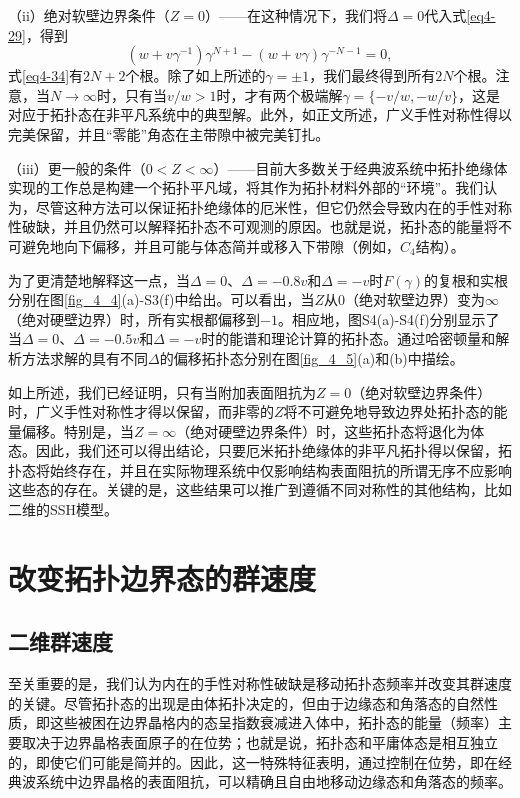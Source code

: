 （ii）绝对软壁边界条件（\(Z = 0\)）——在这种情况下，我们将\(\Delta = 0\)代入式\ref{eq4-29}，得到
\begin{equation}\label{eq4-34}
(w + v\gamma^{-1})\gamma^{N + 1}-(w + v\gamma)\gamma^{-N - 1}=0,
\end{equation}
式\ref{eq4-34}有\(2N + 2\)个根。除了如上所述的\(\gamma=\pm1\)，我们最终得到所有\(2N\)个根。注意，当\(N\rightarrow\infty\)时，只有当\(v/w > 1\)时，才有两个极端解\(\gamma = \{-v/w, -w/v\}\)，这是对应于拓扑态在非平凡系统中的典型解。此外，如正文所述，广义手性对称性得以完美保留，并且“零能”角态在主带隙中被完美钉扎。

（iii）更一般的条件（\(0 < Z < \infty\)）——目前大多数关于经典波系统中拓扑绝缘体实现的工作总是构建一个拓扑平凡域，将其作为拓扑材料外部的“环境”。我们认为，尽管这种方法可以保证拓扑绝缘体的厄米性，但它仍然会导致内在的手性对称性破缺，并且仍然可以解释拓扑态不可观测的原因。也就是说，拓扑态的能量将不可避免地向下偏移，并且可能与体态简并或移入下带隙（例如，\(C_{4}\)结构）。

为了更清楚地解释这一点，当\(\Delta = 0\)、\(\Delta = -0.8v\)和\(\Delta = -v\)时\(F(\gamma)\)的复根和实根分别在图\ref{fig_4_4}(a)-S3(f)中给出。可以看出，当\(Z\)从\(0\)（绝对软壁边界）变为\(\infty\)（绝对硬壁边界）时，所有实根都偏移到\(-1\)。相应地，图S4(a)-S4(f)分别显示了当\(\Delta = 0\)、\(\Delta = -0.5v\)和\(\Delta = -v\)时的能谱和理论计算的拓扑态。通过哈密顿量和解析方法求解的具有不同\(\Delta\)的偏移拓扑态分别在图\ref{fig_4_5}(a)和(b)中描绘。

如上所述，我们已经证明，只有当附加表面阻抗为\(Z = 0\)（绝对软壁边界条件）时，广义手性对称性才得以保留，而非零的\(Z\)将不可避免地导致边界处拓扑态的能量偏移。特别是，当\(Z = \infty\)（绝对硬壁边界条件）时，这些拓扑态将退化为体态。因此，我们还可以得出结论，只要厄米拓扑绝缘体的非平凡拓扑得以保留，拓扑态将始终存在，并且在实际物理系统中仅影响结构表面阻抗的所谓无序不应影响这些态的存在。关键的是，这些结果可以推广到遵循不同对称性的其他结构，比如二维的SSH模型。

\section{改变拓扑边界态的群速度}
\subsection{二维群速度}
至关重要的是，我们认为内在的手性对称性破缺是移动拓扑态频率并改变其群速度的关键。尽管拓扑态的出现是由体拓扑决定的，但由于边缘态和角落态的自然性质，即这些被困在边界晶格内的态呈指数衰减进入体中，拓扑态的能量（频率）主要取决于边界晶格表面原子的在位势；也就是说，拓扑态和平庸体态是相互独立的，即使它们可能是简并的。因此，这一特殊特征表明，通过控制在位势，即在经典波系统中边界晶格的表面阻抗，可以精确且自由地移动边缘态和角落态的频率。

